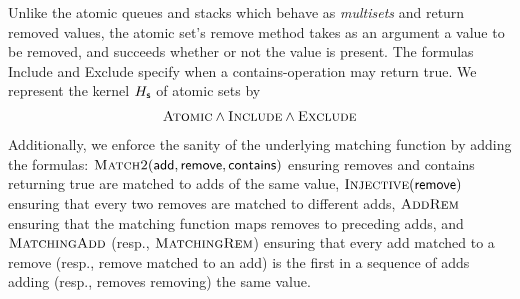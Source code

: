 %
%

\begin{example}

  Unlike the atomic queues and stacks which behave as \emph{multisets} and
  return removed values, the atomic set's {\sf remove} method takes as an
  argument a value to be removed, and succeeds whether or not the value is
  present. The formulas {\sc Include} and {\sc Exclude} specify when a {\sf
  contains}-operation may return {\sf true}. We represent the kernel $H_{\sf s}$
  of atomic sets by  
  \begin{align*}
    \textsc{Atomic} \land \textsc{Include} \land \textsc{Exclude}
  \end{align*}
  Additionally, we enforce the sanity of the underlying matching function by
  adding the formulas: $\textsc{Match2}({\sf add},{\sf
  remove},{\sf contains})$ ensuring removes and contains returning true
  are matched to adds of the same value, $\textsc{Injective}({\sf remove})$ 
  ensuring that every two removes are matched to different adds,
  $\textsc{AddRem}$ ensuring that the matching function maps removes to preceding
  adds, and 
  $\textsc{MatchingAdd}$ (resp., $\textsc{MatchingRem}$) ensuring that every add matched to a remove
  (resp., remove matched to an add) is the first in a sequence of adds adding 
  (resp., removes removing) the same value.

\end{example}

